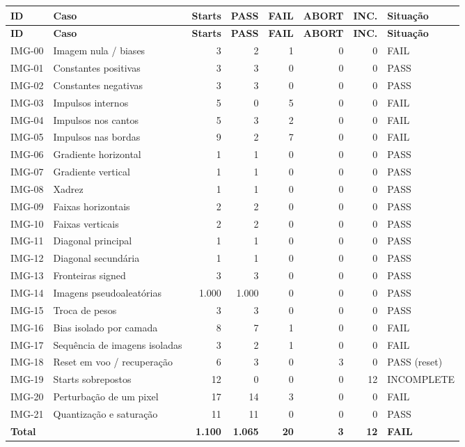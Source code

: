 \small
\begin{longtable}{l p{8.1cm} r r r r r l}
\toprule\textbf{ID} & \textbf{Caso} & \textbf{Starts} & \textbf{PASS} & \textbf{FAIL} & \textbf{ABORT} & \textbf{INC.} & \textbf{Situação}\\\midrule
\endfirsthead
\toprule\textbf{ID} & \textbf{Caso} & \textbf{Starts} & \textbf{PASS} & \textbf{FAIL} & \textbf{ABORT} & \textbf{INC.} & \textbf{Situação}\\\midrule\endhead
IMG-00 & Imagem nula / biases & 3 & 2 & 1 & 0 & 0 & FAIL\\
IMG-01 & Constantes positivas & 3 & 3 & 0 & 0 & 0 & PASS\\
IMG-02 & Constantes negativas & 3 & 3 & 0 & 0 & 0 & PASS\\
IMG-03 & Impulsos internos & 5 & 0 & 5 & 0 & 0 & FAIL\\
IMG-04 & Impulsos nos cantos & 5 & 3 & 2 & 0 & 0 & FAIL\\
IMG-05 & Impulsos nas bordas & 9 & 2 & 7 & 0 & 0 & FAIL\\
IMG-06 & Gradiente horizontal & 1 & 1 & 0 & 0 & 0 & PASS\\
IMG-07 & Gradiente vertical & 1 & 1 & 0 & 0 & 0 & PASS\\
IMG-08 & Xadrez & 1 & 1 & 0 & 0 & 0 & PASS\\
IMG-09 & Faixas horizontais & 2 & 2 & 0 & 0 & 0 & PASS\\
IMG-10 & Faixas verticais & 2 & 2 & 0 & 0 & 0 & PASS\\
IMG-11 & Diagonal principal & 1 & 1 & 0 & 0 & 0 & PASS\\
IMG-12 & Diagonal secundária & 1 & 1 & 0 & 0 & 0 & PASS\\
IMG-13 & Fronteiras signed & 3 & 3 & 0 & 0 & 0 & PASS\\
IMG-14 & Imagens pseudoaleatórias & 1.000 & 1.000 & 0 & 0 & 0 & PASS\\
IMG-15 & Troca de pesos & 3 & 3 & 0 & 0 & 0 & PASS\\
IMG-16 & Bias isolado por camada & 8 & 7 & 1 & 0 & 0 & FAIL\\
IMG-17 & Sequência de imagens isoladas & 3 & 2 & 1 & 0 & 0 & FAIL\\
IMG-18 & Reset em voo / recuperação & 6 & 3 & 0 & 3 & 0 & PASS (reset)\\
IMG-19 & Starts sobrepostos & 12 & 0 & 0 & 0 & 12 & INCOMPLETE\\
IMG-20 & Perturbação de um pixel & 17 & 14 & 3 & 0 & 0 & FAIL\\
IMG-21 & Quantização e saturação & 11 & 11 & 0 & 0 & 0 & PASS\\
\midrule\textbf{Total} && \textbf{1.100} & \textbf{1.065} & \textbf{20} & \textbf{3} & \textbf{12} & \textbf{FAIL}\\\bottomrule
\end{longtable}\normalsize
